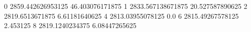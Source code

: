 0 2859.442626953125 46.403076171875
1 2833.567138671875 20.527587890625
2 2819.6513671875 6.61181640625
4 2813.03955078125 0.0
6 2815.49267578125 2.453125
8 2819.1240234375 6.08447265625

